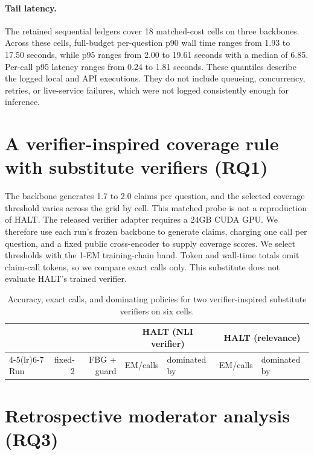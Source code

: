 \documentclass[manuscript,nonacm]{acmart}
\begin{document}
\paragraph{Tail latency.}
The retained sequential ledgers cover 18 matched-cost cells on three
backbones. Across these cells, full-budget per-question p90 wall time ranges
from 1.93 to 17.50 seconds, while p95 ranges from 2.00 to 19.61 seconds with a
median of 6.85. Per-call p95 latency ranges from 0.24 to 1.81 seconds. These
quantiles describe the logged local and API executions. They do not include
queueing, concurrency, retries, or live-service failures, which were not
logged consistently enough for inference.

\FloatBarrier
\section{A verifier-inspired coverage rule with substitute verifiers (RQ1)}
\label{supp:halt}

The backbone generates 1.7 to 2.0 claims per question, and the selected
coverage threshold varies across the grid by cell.
This matched probe is not a reproduction of HALT. The released verifier
adapter requires a 24GB CUDA GPU. We therefore use each run's frozen backbone
to generate claims, charging one call per question, and a fixed public
cross-encoder to supply coverage scores. We select thresholds with the 1-EM
training-chain band. Token and wall-time totals omit claim-call tokens, so we
compare exact calls only. This substitute does not evaluate HALT's trained
verifier.

\begin{table}[!htbp]
\caption{Accuracy, exact calls, and dominating policies for two
verifier-inspired
substitute verifiers on six cells.}
\label{tab:supp-halt}
\footnotesize
\setlength{\tabcolsep}{3pt}
\begin{tabular}{lrrrlrl}
\toprule
& & & \multicolumn{2}{c}{HALT (NLI verifier)} & \multicolumn{2}{c}{HALT (relevance)} \\
\cmidrule(lr){4-5}\cmidrule(lr){6-7}
Run & fixed-2 & FBG + guard & EM/calls & dominated by & EM/calls & dominated by \\
\midrule

\bottomrule
\end{tabular}
\end{table}

\FloatBarrier
\section{Retrospective moderator analysis (RQ3)}
\label{supp:whenwins}
\end{document}
